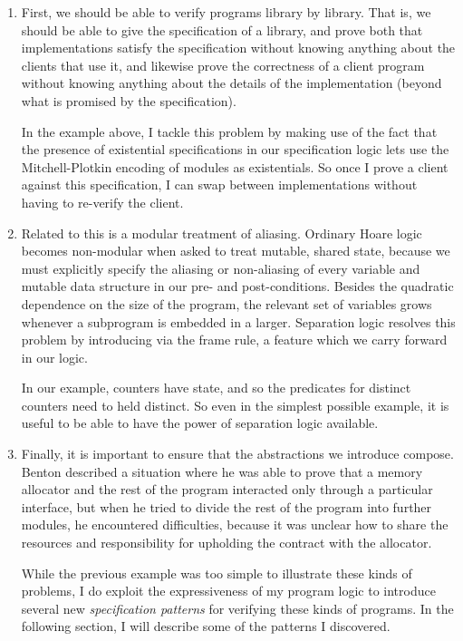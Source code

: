 \begin{enumerate}
\item First, we should be able to verify programs library by
  library. That is, we should be able to give the specification of a
  library, and prove both that implementations satisfy the
  specification without knowing anything about the clients that use
  it, and likewise prove the correctness of a client program without
  knowing anything about the details of the implementation (beyond
  what is promised by the specification). 

  In the example above, I tackle this problem by making use of the
  fact that the presence of existential specifications in our
  specification logic lets use the Mitchell-Plotkin encoding of
  modules as existentials. So once I prove a client against this
  specification, I can swap between implementations without having
  to re-verify the client. 

\item Related to this is a modular treatment of aliasing. Ordinary
  Hoare logic becomes non-modular when asked to treat mutable, shared
  state, because we must explicitly specify the aliasing or
  non-aliasing of every variable and mutable data structure in our
  pre- and post-conditions. Besides the quadratic dependence on the
  size of the program, the relevant set of variables grows whenever a
  subprogram is embedded in a larger. Separation logic resolves this
  problem by introducing via the frame rule, a feature which we carry
  forward in our logic.

  In our example, counters have state, and so the predicates for
  distinct counters need to held distinct. So even in the simplest
  possible example, it is useful to be able to have the power of 
  separation logic available. 

\item Finally, it is important to ensure that the abstractions we
  introduce compose. Benton\cite{benton-modularity} described a
  situation where he was able to prove that a memory allocator and the
  rest of the program interacted only through a particular interface,
  but when he tried to divide the rest of the program into further
  modules, he encountered difficulties, because it was unclear how to
  share the resources and responsibility for upholding the contract
  with the allocator.

  While the previous example was too simple to illustrate these kinds
  of problems, I do exploit the expressiveness of my program logic to
  introduce several new \emph{specification patterns} for verifying
  these kinds of programs. In the following section, I will describe
  some of the patterns I discovered.
\end{enumerate}

